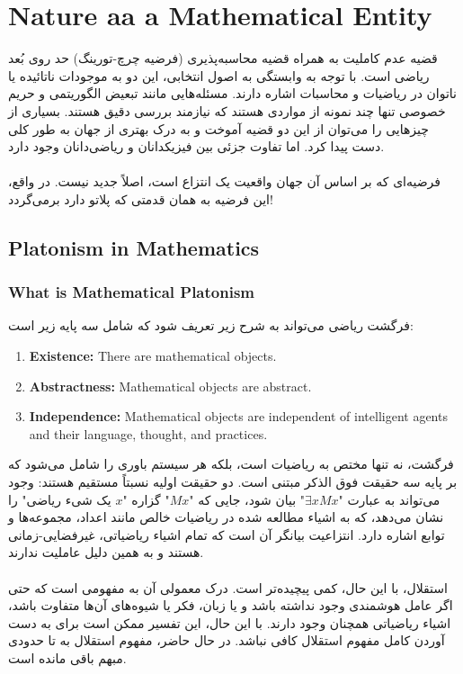 \documentclass[10pt,a4paper]{article}
\begin{document}
            \section{Nature aa a Mathematical Entity}
قضیه عدم کاملیت به همراه قضیه محاسبه‌پذیری (فرضیه چرچ-تورینگ) حد روی بُعد ریاضی است. با توجه به وابستگی به اصول انتخابی، این دو به موجودات ناتائیده یا ناتوان در ریاضیات و محاسبات اشاره دارند. مسئله‌هایی مانند تبعیض الگوریتمی و حریم خصوصی تنها چند نمونه از مواردی هستند که نیازمند بررسی دقیق هستند. بسیاری از چیزهایی را می‌توان از این دو قضیه آموخت و به درک بهتری از جهان به طور کلی دست پیدا کرد. اما تفاوت جزئی بین فیزیکدانان و ریاضی‌دانان وجود دارد.
                \\
                \\
فرضیه‌ای که بر اساس آن جهان واقعیت یک انتزاع است، اصلاً جدید نیست. در واقع، این فرضیه به همان قدمتی که پلاتو دارد برمی‌گردد!
                \subsection{Platonism in Mathematics}
                    \subsubsection{What is Mathematical Platonism}
فرگشت ریاضی می‌تواند به شرح زیر تعریف شود که شامل سه پایه زیر است:
                        \begin{enumerate}
                            \item  \textbf{Existence: }There are mathematical objects.
                            \item  \textbf{Abstractness:} Mathematical objects are abstract.
                            \item  \textbf{Independence:} Mathematical objects are independent of intelligent agents and their language, thought, and practices.
                        \end{enumerate}
                        فرگشت، نه تنها مختص به ریاضیات است، بلکه هر سیستم باوری را شامل می‌شود که بر پایه سه حقیقت فوق الذکر مبتنی است. دو حقیقت اولیه نسبتاً مستقیم هستند: وجود می‌تواند به عبارت "$\exists xMx$" بیان شود، جایی که "$Mx$" گزاره "$x$ یک شیء ریاضی" را نشان می‌دهد، که به اشیاء مطالعه شده در ریاضیات خالص مانند اعداد، مجموعه‌ها و توابع اشاره دارد. انتزاعیت بیانگر آن است که تمام اشیاء ریاضیاتی، غیرفضایی-زمانی هستند و به همین دلیل عاملیت ندارند. \cite{sep-platonism-mathematics}
                        \\
                        \\
استقلال، با این حال، کمی پیچیده‌تر است. درک معمولی آن به مفهومی است که حتی اگر عامل هوشمندی وجود نداشته باشد و یا زبان، فکر یا شیوه‌های آن‌ها متفاوت باشد، اشیاء ریاضیاتی همچنان وجود دارند. با این حال، این تفسیر ممکن است برای به دست آوردن کامل مفهوم استقلال کافی نباشد. در حال حاضر، مفهوم استقلال به تا حدودی مبهم باقی مانده است.
\end{document}
